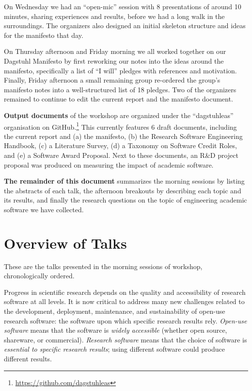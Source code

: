 \documentclass[a4paper,UKenglish]{dagrep}
\begin{document}
On Wednesday we had an ``open-mic'' session with 8 presentations of around 10 minutes, sharing experiences and results, before we had a long walk in the surroundings. The organizers also designed an initial skeleton structure and ideas for the manifesto that day.

On Thursday afternoon and Friday morning we all worked together on our Dagstuhl Manifesto by first reworking our notes into the ideas around the manifesto, specifically a list of ``I will'' pledges with references and motivation. Finally, Friday afternoon a small remaining group re-ordered the group's manifesto notes into a well-structured list of 18 pledges. Two of the organizers remained to continue to edit the current report and the manifesto document.

\textbf{Output documents} of the workshop are organized under the ``dagstuhleas'' organisation on GitHub.\footnote{\url{https://github.com/dagstuhleas}} This currently features 6 draft documents, including the current report and (a) the manifesto, (b) the Research Software Engineering Handbook, (c) a Literature Survey, (d) a Taxonomy on Software Credit Roles, and (e) a Software Award Proposal. Next to these documents, an R\&D project proposal was produced on measuring the impact of academic software.

\textbf{The remainder of this document} summarizes the morning sessions by listing the abstracts of each talk, the afternoon breakouts by describing each topic and its results, and finally the research questions on the topic of engineering academic software we have collected.

\tableofcontents

\section{Overview of Talks}

These are the talks presented in the morning sessions of workshop, chronologically ordered.



Progress in scientific research depends on the quality and accessibility of research software at all levels. It is now critical to address many new challenges related to the development, deployment, maintenance, and sustainability of open-use research software: the software upon which specific research results rely.  \emph{Open-use software} means that the software is \emph{widely accessible} (whether open source, shareware, or commercial).  \emph{Research software} means that the choice of software is \emph{essential to specific research results}; using different software could produce different results.
\end{document}
